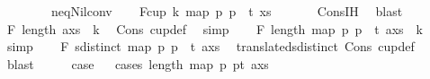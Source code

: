 \begin{isabellebody}
\ \ \ \ \ \ \ \ neq{\isacharunderscore}{\kern0pt}Nil{\isacharunderscore}{\kern0pt}conv{\isacharparenright}{\kern0pt}\isanewline
\ \ \isamarkupfalse%
\ F{}{\isacharcolon}{\kern0pt}{\isachardoublequoteopen}cup\ {\isacharparenleft}{\kern0pt}k{\isacharminus}{\kern0pt}{}{\isacharparenright}{\kern0pt}\ {\isacharparenleft}{\kern0pt}map\ {\isacharparenleft}{\kern0pt}{\isasymlambda}p{\isachardot}{\kern0pt}\ p\ {\isacharplus}{\kern0pt}\ t{\isacharparenright}{\kern0pt}\ xs{\isacharparenright}{\kern0pt}{\isachardoublequoteclose}\ \isanewline
\ \ \ \ \isamarkupfalse%
\ Cons{\isachardot}{\kern0pt}IH\ \isamarkupfalse%
\ blast\isanewline
\ \ \isamarkupfalse%
\ F{}{\isacharcolon}{\kern0pt}\ {\isachardoublequoteopen}length\ {\isacharparenleft}{\kern0pt}a{\isacharhash}{\kern0pt}xs{\isacharparenright}{\kern0pt}\ {\isacharequal}{\kern0pt}\ k{\isachardoublequoteclose}\ \isamarkupfalse%
\ Cons{\isacharparenleft}{\kern0pt}{}{\isacharparenright}{\kern0pt}\ cup{\isacharunderscore}{\kern0pt}def\ \isamarkupfalse%
\ simp\isanewline
\ \ \isamarkupfalse%
\ F{}{\isacharcolon}{\kern0pt}\ {\isachardoublequoteopen}length\ {\isacharparenleft}{\kern0pt}map\ {\isacharparenleft}{\kern0pt}{\isasymlambda}p{\isachardot}{\kern0pt}\ p\ {\isacharplus}{\kern0pt}\ t{\isacharparenright}{\kern0pt}\ {\isacharparenleft}{\kern0pt}a{\isacharhash}{\kern0pt}xs{\isacharparenright}{\kern0pt}{\isacharparenright}{\kern0pt}\ {\isacharequal}{\kern0pt}\ k{\isachardoublequoteclose}\ \isamarkupfalse%
\ simp\isanewline
\ \ \isamarkupfalse%
\ F{}{\isacharcolon}{\kern0pt}\ {\isachardoublequoteopen}sdistinct\ {\isacharparenleft}{\kern0pt}map\ {\isacharparenleft}{\kern0pt}{\isasymlambda}p{\isachardot}{\kern0pt}\ p\ {\isacharplus}{\kern0pt}\ t{\isacharparenright}{\kern0pt}\ {\isacharparenleft}{\kern0pt}a{\isacharhash}{\kern0pt}xs{\isacharparenright}{\kern0pt}{\isacharparenright}{\kern0pt}{\isachardoublequoteclose}\ \isamarkupfalse%
\ translated{\isacharunderscore}{\kern0pt}sdistinct\ Cons{\isacharparenleft}{\kern0pt}{}{\isacharparenright}{\kern0pt}\ cup{\isacharunderscore}{\kern0pt}def\isanewline
\ \ \ \ \isamarkupfalse%
\ blast\isanewline
\ \ \isamarkupfalse%
\ \isamarkupfalse%
\ {\isacharquery}{\kern0pt}case\isanewline
\ \ \isamarkupfalse%
{\isacharparenleft}{\kern0pt}cases\ {\isachardoublequoteopen}length\ {\isacharparenleft}{\kern0pt}map\ {\isacharparenleft}{\kern0pt}{\isasymlambda}p{\isachardot}{\kern0pt}\ p{\isacharplus}{\kern0pt}t{\isacharparenright}{\kern0pt}\ {\isacharparenleft}{\kern0pt}a{\isacharhash}{\kern0pt}xs{\isacharparenright}{\kern0pt}{\isacharparenright}{\kern0pt}\ {\isasymle}\ {}{\isachardoublequoteclose}{\isacharparenright}{\kern0pt}\isanewline

\end{isabellebody}
